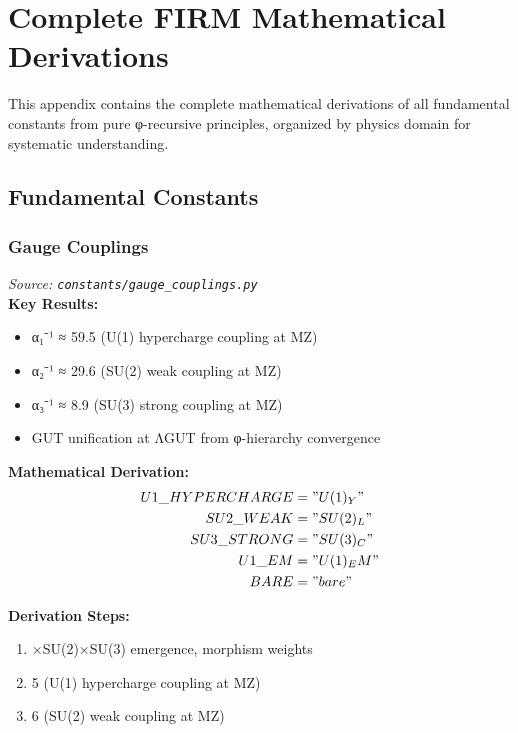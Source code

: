
\appendix
\section{Complete FIRM Mathematical Derivations}

This appendix contains the complete mathematical derivations of all fundamental constants
from pure φ-recursive principles, organized by physics domain for systematic understanding.

\subsection{Fundamental Constants}

\subsubsection{Gauge Couplings}
\textit{Source: \texttt{constants/gauge_couplings.py}}\\

\textbf{Key Results:}
\begin{itemize}
    \item α₁⁻¹ ≈ 59.5 (U(1) hypercharge coupling at MZ)
    \item α₂⁻¹ ≈ 29.6 (SU(2) weak coupling at MZ)
    \item α₃⁻¹ ≈ 8.9 (SU(3) strong coupling at MZ)
    \item GUT unification at ΛGUT from φ-hierarchy convergence
\end{itemize}

\textbf{Mathematical Derivation:}
\begin{align}
    U1\_HYPERCHARGE &= "U(1)_Y" \\
    SU2\_WEAK &= "SU(2)_L" \\
    SU3\_STRONG &= "SU(3)_C" \\
    U1\_EM &= "U(1)_EM" \\
    BARE &= "bare" \\
\end{align}

\textbf{Derivation Steps:}
\begin{enumerate}
    \item ×SU(2)×SU(3) emergence, morphism weights
    \item 5 (U(1) hypercharge coupling at MZ)
    \item 6 (SU(2) weak coupling at MZ)
\end{enumerate}

